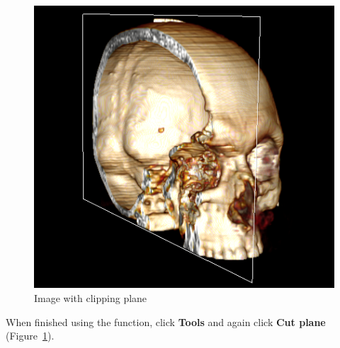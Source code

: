 \begin{figure}[!htb]
\centering
\includegraphics[scale=0.6]{../user_guide_figures/invesalius_screen/cutted_image.png}
\caption{Image with clipping plane}
\label{fig:cutted_image}
\end{figure}

When finished using the function, click \textbf{Tools} and again click \textbf{Cut plane} (Figure~\ref{fig:cutted_image}).
